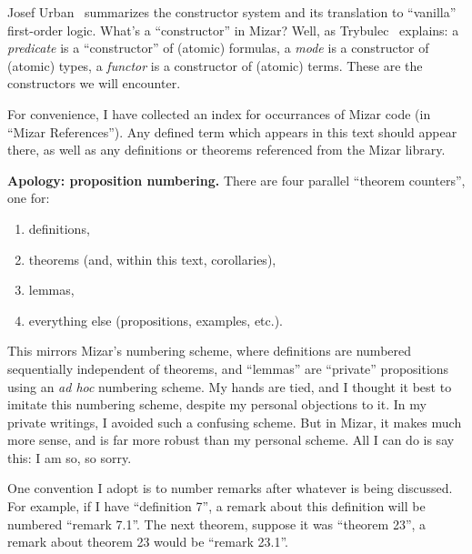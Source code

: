 Josef Urban~\cite{urban2003translating} summarizes the constructor
system and its translation to ``vanilla'' first-order logic. What's a
``constructor'' in Mizar? Well, as Trybulec~\cite{trybulec1993some}
explains: a \emph{predicate} is a ``constructor'' of (atomic) formulas,
a \emph{mode} is a constructor of (atomic) types, a \emph{functor} is a
constructor of (atomic) terms. These are the constructors we will
encounter.

\bigbreak
For convenience, I have collected an index for occurrances of Mizar code
(in ``Mizar References''). Any defined term which appears in this text
should appear there, as well as any definitions or theorems referenced
from the Mizar library.

\bigbreak
\textbf{Apology: proposition numbering.} There are four parallel
``theorem counters'', one for:
\begin{enumerate}
\item definitions,
\item theorems (and, within this text, corollaries),
\item lemmas,
\item everything else (propositions, examples, etc.).
\end{enumerate}
This mirrors Mizar's numbering scheme, where definitions are numbered
sequentially independent of theorems, and ``lemmas'' are ``private''
propositions using an \emph{ad hoc} numbering scheme. My hands are tied,
and I thought it best to imitate this numbering scheme, despite my
personal objections to it. In my private writings, I avoided such a
confusing scheme. But in Mizar, it makes much more sense, and is far
more robust than my personal scheme. All I can do is say this: I am so,
so sorry.

One convention I adopt is to number remarks after whatever is being
discussed. For example, if I have ``definition 7'', a remark about this
definition will be numbered ``remark 7.1''. The next theorem, suppose it
was ``theorem 23'', a remark about theorem 23 would be ``remark 23.1''.


